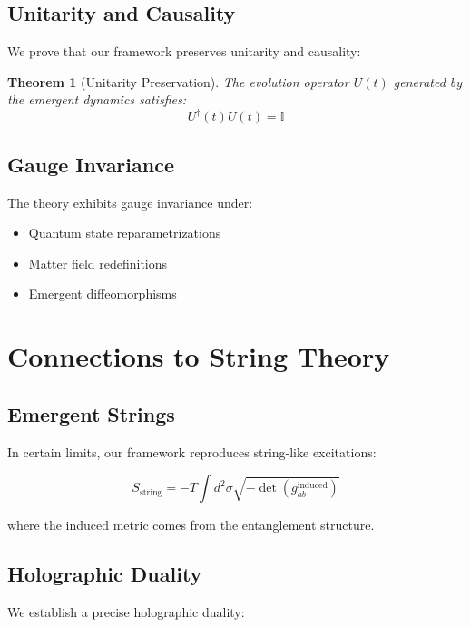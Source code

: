 \documentclass[12pt,a4paper]{article}
\newtheorem{theorem}{Theorem}[section]
\begin{document}
\subsection{Unitarity and Causality}

We prove that our framework preserves unitarity and causality:

\begin{theorem}[Unitarity Preservation]
The evolution operator $U(t)$ generated by the emergent dynamics satisfies:
\begin{equation}
U^\dagger(t) U(t) = \mathbb{I}
\end{equation}
\end{theorem}

\subsection{Gauge Invariance}

The theory exhibits gauge invariance under:
\begin{itemize}
\item Quantum state reparametrizations
\item Matter field redefinitions
\item Emergent diffeomorphisms
\end{itemize}

\section{Connections to String Theory}

\subsection{Emergent Strings}

In certain limits, our framework reproduces string-like excitations:

\begin{equation}
S_{\text{string}} = -T \int d^2\sigma \sqrt{-\det(g_{ab}^{\text{induced}})}
\end{equation}

where the induced metric comes from the entanglement structure.

\subsection{Holographic Duality}

We establish a precise holographic duality:
\end{document}
